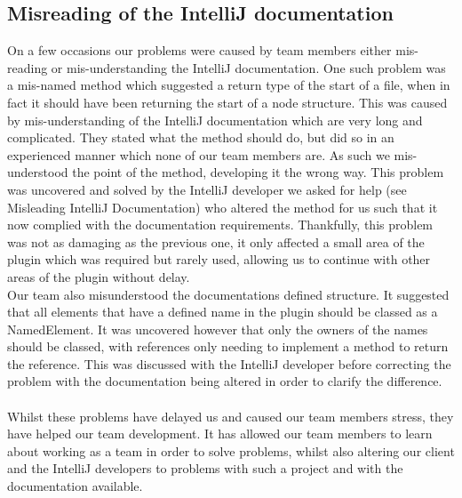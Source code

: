 \subsection{ Misreading of the IntelliJ documentation}
On a few occasions our problems were caused by team members either mis-reading or mis-understanding the IntelliJ documentation. One such problem was a mis-named method which suggested a return type of the start of a file, when in fact it should have been returning the start of a node structure. This was caused by mis-understanding of the IntelliJ documentation which are very long and complicated. They stated what the method should do, but did so in an experienced manner which none of our team members are. As such we mis-understood the point of the method, developing it the wrong way. This problem was uncovered and solved by the IntelliJ developer we asked for help (see Misleading IntelliJ Documentation) who altered the method for us such that it now complied with the documentation requirements. Thankfully, this problem was not as damaging as the previous one, it only affected a small area of the plugin which was required but rarely used, allowing us to continue with other areas of the plugin without delay.\\
Our team also misunderstood the documentations defined structure. It suggested that all elements that have a defined name in the plugin should be classed as a NamedElement. It was uncovered however that only the owners of the names should be classed, with references only needing to implement a method to return the reference. This was discussed with the IntelliJ developer before correcting the problem with the documentation being altered in order to clarify the difference.\\
\\
Whilst these problems have delayed us and caused our team members stress, they have helped our team development. It has allowed our team members to learn about working as a team in order to solve problems, whilst also altering our client and the IntelliJ developers to problems with such a project and with the documentation available. 

